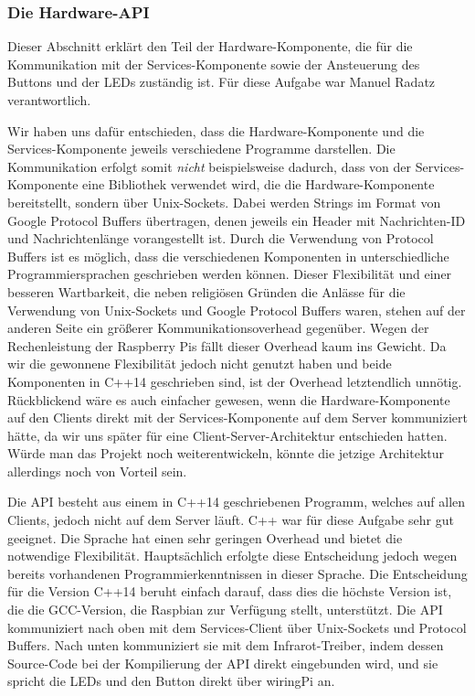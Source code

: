 \subsubsection{Die Hardware-API}

Dieser Abschnitt erklärt den Teil der Hardware-Komponente, die für die Kommunikation mit der
Services-Komponente sowie der Ansteuerung des Buttons und der LEDs zuständig ist.
Für diese Aufgabe war Manuel Radatz verantwortlich.

Wir haben uns dafür entschieden, dass die Hardware-Komponente und die Services-Komponente jeweils
verschiedene Programme darstellen.
Die Kommunikation erfolgt somit \textit{nicht} beispielsweise dadurch, dass von der
Services-Komponente eine Bibliothek verwendet wird, die die Hardware-Komponente bereitstellt,
sondern über Unix-Sockets.
Dabei werden Strings im Format von Google Protocol Buffers übertragen, denen jeweils ein Header mit
Nachrichten-ID und Nachrichtenlänge vorangestellt ist.
Durch die Verwendung von Protocol Buffers ist es möglich, dass die verschiedenen Komponenten in
unterschiedliche Programmiersprachen geschrieben werden können.
Dieser Flexibilität und einer besseren Wartbarkeit, die neben religiösen Gründen die Anlässe für
die Verwendung von Unix-Sockets und Google Protocol Buffers waren, stehen auf der anderen Seite ein
größerer Kommunikationsoverhead gegenüber.
Wegen der Rechenleistung der Raspberry Pis fällt dieser Overhead kaum ins Gewicht.
Da wir die gewonnene Flexibilität jedoch nicht genutzt haben und beide Komponenten in C++14
geschrieben sind, ist der Overhead letztendlich unnötig.
Rückblickend wäre es auch einfacher gewesen, wenn die Hardware-Komponente auf den Clients direkt
mit der Services-Komponente auf dem Server kommuniziert hätte, da wir uns später für eine
Client-Server-Architektur entschieden hatten.
Würde man das Projekt noch weiterentwickeln, könnte die jetzige Architektur allerdings noch von
Vorteil sein.

Die API besteht aus einem in C++14 geschriebenen Programm, welches auf allen Clients, jedoch nicht
auf dem Server läuft.
C++ war für diese Aufgabe sehr gut geeignet.
Die Sprache hat einen sehr geringen Overhead und bietet die notwendige Flexibilität.
Hauptsächlich erfolgte diese Entscheidung jedoch wegen bereits vorhandenen Programmierkenntnissen
in dieser Sprache.
Die Entscheidung für die Version C++14 beruht einfach darauf, dass dies die höchste Version ist, die
die GCC-Version, die Raspbian zur Verfügung stellt, unterstützt.
Die API kommuniziert nach oben mit dem Services-Client über Unix-Sockets und Protocol Buffers.
Nach unten kommuniziert sie mit dem Infrarot-Treiber, indem dessen Source-Code bei der Kompilierung
der API direkt eingebunden wird, und sie spricht die LEDs und den Button direkt über wiringPi an.

